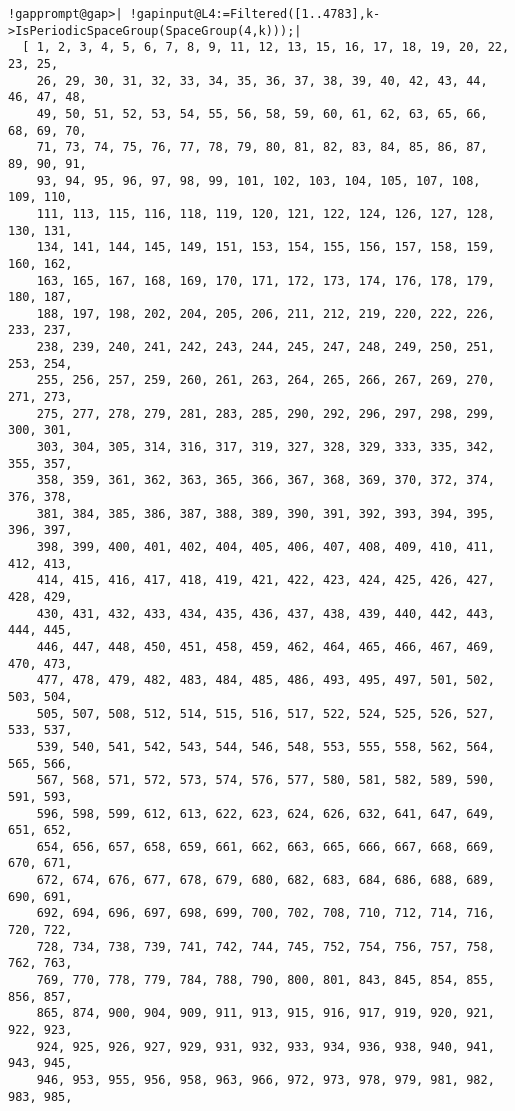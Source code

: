 \documentclass[a4paper,11pt]{report}
\begin{document}
{{\begin{Verbatim}[commandchars=!@|,fontsize=\small,frame=single,label=Example]
  !gapprompt@gap>| !gapinput@L4:=Filtered([1..4783],k->IsPeriodicSpaceGroup(SpaceGroup(4,k)));|
  [ 1, 2, 3, 4, 5, 6, 7, 8, 9, 11, 12, 13, 15, 16, 17, 18, 19, 20, 22, 23, 25,
    26, 29, 30, 31, 32, 33, 34, 35, 36, 37, 38, 39, 40, 42, 43, 44, 46, 47, 48,
    49, 50, 51, 52, 53, 54, 55, 56, 58, 59, 60, 61, 62, 63, 65, 66, 68, 69, 70,
    71, 73, 74, 75, 76, 77, 78, 79, 80, 81, 82, 83, 84, 85, 86, 87, 89, 90, 91,
    93, 94, 95, 96, 97, 98, 99, 101, 102, 103, 104, 105, 107, 108, 109, 110,
    111, 113, 115, 116, 118, 119, 120, 121, 122, 124, 126, 127, 128, 130, 131,
    134, 141, 144, 145, 149, 151, 153, 154, 155, 156, 157, 158, 159, 160, 162,
    163, 165, 167, 168, 169, 170, 171, 172, 173, 174, 176, 178, 179, 180, 187,
    188, 197, 198, 202, 204, 205, 206, 211, 212, 219, 220, 222, 226, 233, 237,
    238, 239, 240, 241, 242, 243, 244, 245, 247, 248, 249, 250, 251, 253, 254,
    255, 256, 257, 259, 260, 261, 263, 264, 265, 266, 267, 269, 270, 271, 273,
    275, 277, 278, 279, 281, 283, 285, 290, 292, 296, 297, 298, 299, 300, 301,
    303, 304, 305, 314, 316, 317, 319, 327, 328, 329, 333, 335, 342, 355, 357,
    358, 359, 361, 362, 363, 365, 366, 367, 368, 369, 370, 372, 374, 376, 378,
    381, 384, 385, 386, 387, 388, 389, 390, 391, 392, 393, 394, 395, 396, 397,
    398, 399, 400, 401, 402, 404, 405, 406, 407, 408, 409, 410, 411, 412, 413,
    414, 415, 416, 417, 418, 419, 421, 422, 423, 424, 425, 426, 427, 428, 429,
    430, 431, 432, 433, 434, 435, 436, 437, 438, 439, 440, 442, 443, 444, 445,
    446, 447, 448, 450, 451, 458, 459, 462, 464, 465, 466, 467, 469, 470, 473,
    477, 478, 479, 482, 483, 484, 485, 486, 493, 495, 497, 501, 502, 503, 504,
    505, 507, 508, 512, 514, 515, 516, 517, 522, 524, 525, 526, 527, 533, 537,
    539, 540, 541, 542, 543, 544, 546, 548, 553, 555, 558, 562, 564, 565, 566,
    567, 568, 571, 572, 573, 574, 576, 577, 580, 581, 582, 589, 590, 591, 593,
    596, 598, 599, 612, 613, 622, 623, 624, 626, 632, 641, 647, 649, 651, 652,
    654, 656, 657, 658, 659, 661, 662, 663, 665, 666, 667, 668, 669, 670, 671,
    672, 674, 676, 677, 678, 679, 680, 682, 683, 684, 686, 688, 689, 690, 691,
    692, 694, 696, 697, 698, 699, 700, 702, 708, 710, 712, 714, 716, 720, 722,
    728, 734, 738, 739, 741, 742, 744, 745, 752, 754, 756, 757, 758, 762, 763,
    769, 770, 778, 779, 784, 788, 790, 800, 801, 843, 845, 854, 855, 856, 857,
    865, 874, 900, 904, 909, 911, 913, 915, 916, 917, 919, 920, 921, 922, 923,
    924, 925, 926, 927, 929, 931, 932, 933, 934, 936, 938, 940, 941, 943, 945,
    946, 953, 955, 956, 958, 963, 966, 972, 973, 978, 979, 981, 982, 983, 985,

\end{Verbatim}}}
\end{document}
